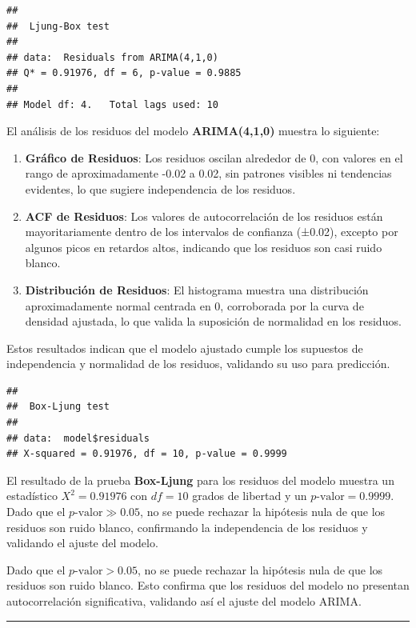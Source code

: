 \documentclass[
]{book}
\begin{document}
\begin{verbatim}
## 
##  Ljung-Box test
## 
## data:  Residuals from ARIMA(4,1,0)
## Q* = 0.91976, df = 6, p-value = 0.9885
## 
## Model df: 4.   Total lags used: 10
\end{verbatim}

El análisis de los residuos del modelo \textbf{ARIMA(4,1,0)} muestra lo siguiente:

\begin{enumerate}
\def\labelenumi{\arabic{enumi}.}
\item
  \textbf{Gráfico de Residuos}: Los residuos oscilan alrededor de 0, con valores en el rango de aproximadamente -0.02 a 0.02, sin patrones visibles ni tendencias evidentes, lo que sugiere independencia de los residuos.
\item
  \textbf{ACF de Residuos}: Los valores de autocorrelación de los residuos están mayoritariamente dentro de los intervalos de confianza (±0.02), excepto por algunos picos en retardos altos, indicando que los residuos son casi ruido blanco.
\item
  \textbf{Distribución de Residuos}: El histograma muestra una distribución aproximadamente normal centrada en 0, corroborada por la curva de densidad ajustada, lo que valida la suposición de normalidad en los residuos.
\end{enumerate}

Estos resultados indican que el modelo ajustado cumple los supuestos de independencia y normalidad de los residuos, validando su uso para predicción.

\begin{verbatim}
## 
##  Box-Ljung test
## 
## data:  model$residuals
## X-squared = 0.91976, df = 10, p-value = 0.9999
\end{verbatim}

El resultado de la prueba \textbf{Box-Ljung} para los residuos del modelo muestra un estadístico \(X^2 = 0.91976\) con \(df = 10\) grados de libertad y un \(p\text{-valor} = 0.9999\). Dado que el \(p\text{-valor} \gg 0.05\), no se puede rechazar la hipótesis nula de que los residuos son ruido blanco, confirmando la independencia de los residuos y validando el ajuste del modelo.

Dado que el \(p\text{-valor} > 0.05\), no se puede rechazar la hipótesis nula de que los residuos son ruido blanco. Esto confirma que los residuos del modelo no presentan autocorrelación significativa, validando así el ajuste del modelo ARIMA.

\begin{center}\rule{0.5\linewidth}{0.5pt}\end{center}
\end{document}
